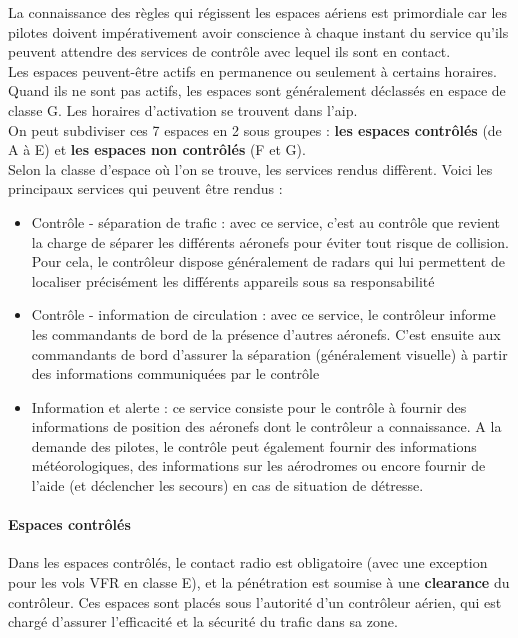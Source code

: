 		La connaissance des règles qui régissent les espaces aériens est primordiale car les pilotes doivent impérativement avoir conscience à chaque instant du service qu'ils peuvent attendre des services de contrôle avec lequel ils sont en contact.\\
		
		Les espaces peuvent-être actifs en permanence ou seulement à certains horaires. Quand ils ne sont pas actifs, les espaces sont généralement déclassés en espace de classe G. Les horaires d'activation se trouvent dans l'\acrshort{aip}. \\
		
		On peut subdiviser ces 7 espaces en 2 sous groupes : \textbf{les espaces contrôlés} (de A à E) et \textbf{les espaces non contrôlés} (F et G). \\
		
		Selon la classe d'espace où l'on se trouve, les services rendus diffèrent. Voici les principaux services qui peuvent être rendus :
		\begin{itemize}
			\item Contrôle - séparation de trafic : avec ce service, c'est au contrôle que revient la charge de séparer les différents aéronefs pour éviter tout risque de collision. Pour cela, le contrôleur dispose généralement de radars qui lui permettent de localiser précisément les différents appareils sous sa responsabilité
			\item Contrôle - information de circulation : avec ce service, le contrôleur informe les commandants de bord de la présence d'autres aéronefs. C'est ensuite aux commandants de bord d'assurer la séparation (généralement visuelle) à partir des informations communiquées par le contrôle
			\item Information et alerte : ce service consiste pour le contrôle à fournir des informations de position des aéronefs dont le contrôleur a connaissance. A la demande des pilotes, le contrôle peut également fournir des informations météorologiques, des informations sur les aérodromes ou encore fournir de l'aide (et déclencher les secours) en cas de situation de détresse.
		\end{itemize}
		
		\paragraph{Espaces contrôlés}
		Dans les espaces contrôlés, le contact radio est obligatoire (avec une exception pour les vols VFR en classe E), et la pénétration est soumise à une \textbf{clearance} du contrôleur. Ces espaces sont placés sous l'autorité d'un contrôleur aérien, qui est chargé d'assurer l'efficacité et la sécurité du trafic dans sa zone.
		
